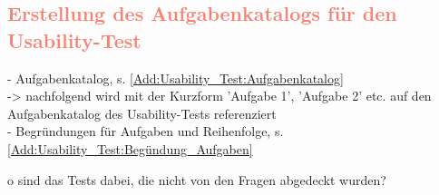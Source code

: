 \subsection{\textcolor{Salmon}{Erstellung des Aufgabenkatalogs für den Usability-Test}}
\label{ch:Validierung:sec:Material:Usability_Test}
- Aufgabenkatalog, s. \autoref{Add:Usability_Test:Aufgabenkatalog}\\
-> nachfolgend wird mit der Kurzform 'Aufgabe 1', 'Aufgabe 2' etc. auf den Aufgabenkatalog des Usability-Tests referenziert\\
- Begründungen für Aufgaben und Reihenfolge, s. \autoref{Add:Usability_Test:Begündung_Aufgaben}

o	sind das Tests dabei, die nicht von den Fragen abgedeckt wurden?
